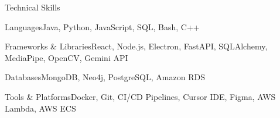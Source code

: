 \documentclass[
	11pt
]{resume}
\begin{document}
	\begin{rSection}{T}{echnical Skills}
		\begin{rSet}{Languages}{Java, Python, JavaScript, SQL, Bash, C++}
		\end{rSet}
		\begin{rSet}{Frameworks \& Libraries}{React, Node.js, Electron, FastAPI, SQLAlchemy, MediaPipe, OpenCV, Gemini API}
		\end{rSet}
		\begin{rSet}{Databases}{MongoDB, Neo4j, PostgreSQL, Amazon RDS}
		\end{rSet}
		\begin{rSet}{Tools \& Platforms}{Docker, Git, CI/CD Pipelines, Cursor IDE, Figma, AWS Lambda, AWS ECS}
		\end{rSet}
	\end{rSection}
\end{document}
